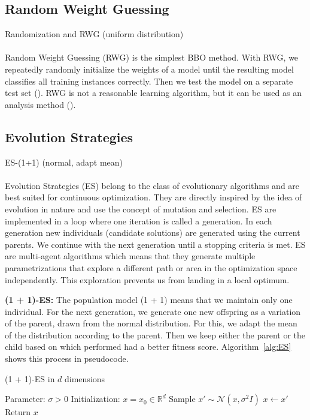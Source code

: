 \subsection{Random Weight Guessing}
Randomization and RWG (uniform distribution) \\ \\
Random Weight Guessing (RWG) is the simplest BBO method. With RWG, we repeatedly randomly initialize the weights of a model until the resulting model classifies all training instances correctly. Then we test the model on a separate test set (\cite{schmidhuber2001evaluating}). RWG is not a reasonable learning algorithm, but it can be used as an analysis method (\cite{oller_analyzing_2020}).

\subsection{Evolution Strategies}
ES-(1+1) (normal, adapt mean) \\ \\
Evolution Strategies (ES) belong to the class of evolutionary algorithms and are best suited for continuous optimization. They are directly inspired by the idea of evolution in nature and use the concept of mutation and selection. ES are implemented in a loop where one iteration is called a generation. In each generation new individuals (candidate solutions) are generated using the current parents. We continue with the next generation until a stopping criteria is met. ES are multi-agent algorithms which means that they generate multiple parametrizations that explore a different path or area in the optimization space independently. This exploration prevents us from landing in a local optimum.

\textbf{(1 + 1)-ES:} The population model (1 + 1) means that we maintain only one individual. For the next generation, we generate one new offspring as a variation of the parent, drawn from the normal distribution. For this, we adapt the mean of the distribution according to the parent. Then we keep either the parent or the child based on which performed had a better fitness score. Algorithm~\ref{alg:ES} shows this process in pseudocode.
\begin{algorithm}
\caption{(1 + 1)-ES in $d$ dimensions}
\begin{algorithmic}[1]
\State Parameter: $\sigma > 0$
\State Initialization: $x = x_0 \in \mathbb{R}^d$
    \State Sample $x' \sim \mathcal{N}(x, \sigma^2 I)$
      \State $x \leftarrow x'$
    \EndIf
\EndWhile
\State Return $x$
\end{algorithmic}
\label{alg:ES}
\end{algorithm}

